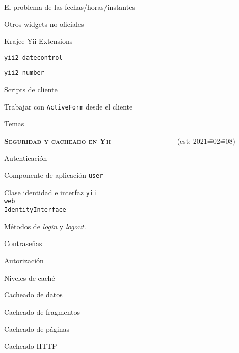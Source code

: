 \begin{longenum}
\begin{longenum}
\begin{longenum}
            \item El problema de las fechas/horas/instantes
            \item Otros widgets no oficiales
            \begin{longenum}
                \item Krajee Yii Extensions
                \begin{longenum}
                    \item \texttt{yii2-datecontrol}
                    \item \texttt{yii2-number}
                \end{longenum}
            \end{longenum}
        \end{longenum}
        \item Scripts de cliente
        \item Trabajar con \texttt{ActiveForm} desde el cliente
        \item Temas \opcional\
    \end{longenum}
    \item \textbf{\textsc{Seguridad y cacheado en Yii}} \ \ \ \ \ \ \ \ \ \ \ \ \ \ \ \ \ \ (est: 2021\==02\==08)
    \begin{longenum}
        \item Autenticación
        \begin{longenum}
            \item Componente de aplicación \texttt{user}
            \item Clase identidad e interfaz \texttt{yii\\web\\IdentityInterface}
            \item Métodos de \textit{login} y \textit{logout}.
        \end{longenum}
        \item Contraseñas
        \item Autorización
        \item Niveles de caché 
        \begin{longenum}
            \item Cacheado de datos
            \item Cacheado de fragmentos
            \item Cacheado de páginas
            \item Cacheado HTTP
        \end{longenum}

\end{longenum}
\end{longenum}
